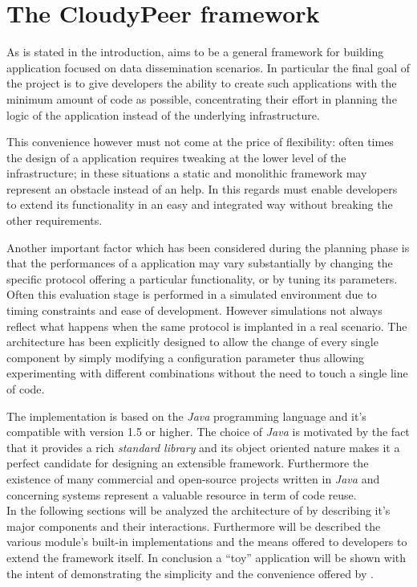 \chapter{The CloudyPeer framework}
As is stated in the
introduction, \cloudypeer aims to be a general framework for building
\ptop application focused on data dissemination scenarios.
In particular the final goal of the project is to give developers the
ability to create such applications with the minimum amount of code as
possible, concentrating their effort in planning the logic of the
application instead of the underlying \ptop infrastructure.

This convenience however must not come at the price of
flexibility: often times the design of a \ptop application requires
tweaking at the lower level of the infrastructure; in these situations
a static and monolithic framework may represent an obstacle instead of
an help.
In this regards \cloudypeer must enable developers to extend its
functionality in an easy and integrated way without breaking the other
requirements.

Another important factor which has been considered during the
planning phase is that the performances of a \ptop application may
vary substantially by changing the specific protocol offering a
particular functionality, or by tuning its parameters. Often this
evaluation stage is performed in a simulated environment due to timing
constraints and ease of development. However simulations not always
reflect what happens when the same protocol is implanted in a real
scenario.
The \cloudypeer architecture has been explicitly designed to allow the change
of every single component by simply modifying a configuration
parameter thus allowing experimenting with different
combinations without the need to touch a single line of code.

The implementation is based on the \emph{Java} programming language and it's
compatible with version 1.5 or higher. The
choice of \emph{Java} is motivated by the fact that it provides a rich
\emph{standard library} and its object oriented nature makes it a
perfect candidate for designing an extensible framework. Furthermore
the existence of many commercial and open-source projects written in
\emph{Java} and concerning \ptop systems represent a valuable resource
in term of code reuse.
\ \\
In the following sections will be analyzed the architecture of
\cloudypeer by describing it's major components and their interactions.
Furthermore will be described the various module's
built-in implementations and the means offered to developers to extend
the framework itself.
In conclusion a ``toy'' application will be shown with the intent of
demonstrating the simplicity and the convenience offered by
\cloudypeer.

